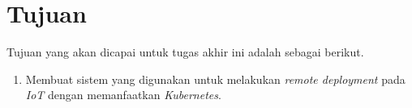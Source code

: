 \section{Tujuan}

Tujuan yang akan dicapai untuk tugas akhir ini adalah sebagai berikut.

\begin{enumerate}
  \item Membuat sistem yang digunakan untuk melakukan \textit{remote deployment} pada \textit{IoT} dengan memanfaatkan \textit{Kubernetes}.
\end{enumerate}